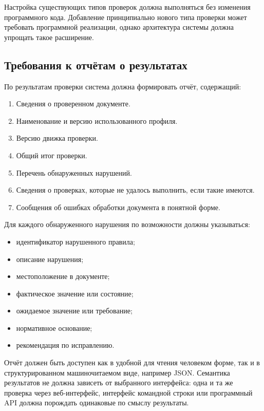 \documentclass[a4paper,14pt]{extarticle}
\begin{document}
Настройка существующих типов проверок должна выполняться без изменения программного кода. Добавление принципиально нового типа проверки может требовать программной реализации, однако архитектура системы должна упрощать такое расширение.

\subsection{Требования к отчётам о результатах}

По результатам проверки система должна формировать отчёт, содержащий:

\begin{enumerate}
    \item Сведения о проверенном документе.
    \item Наименование и версию использованного профиля.
    \item Версию движка проверки.
    \item Общий итог проверки.
    \item Перечень обнаруженных нарушений.
    \item Сведения о проверках, которые не удалось выполнить, если такие имеются.
    \item Сообщения об ошибках обработки документа в понятной форме.
\end{enumerate}

Для каждого обнаруженного нарушения по возможности должны указываться:

\begin{itemize}
    \item идентификатор нарушенного правила;
    \item описание нарушения;
    \item местоположение в документе;
    \item фактическое значение или состояние;
    \item ожидаемое значение или требование;
    \item нормативное основание;
    \item рекомендация по исправлению.
\end{itemize}

Отчёт должен быть доступен как в удобной для чтения человеком форме, так и в структурированном машиночитаемом виде, например JSON. Семантика результатов не должна зависеть от выбранного интерфейса: одна и та же проверка через веб-интерфейс, интерфейс командной строки или программный API должна порождать одинаковые по смыслу результаты.
\end{document}
